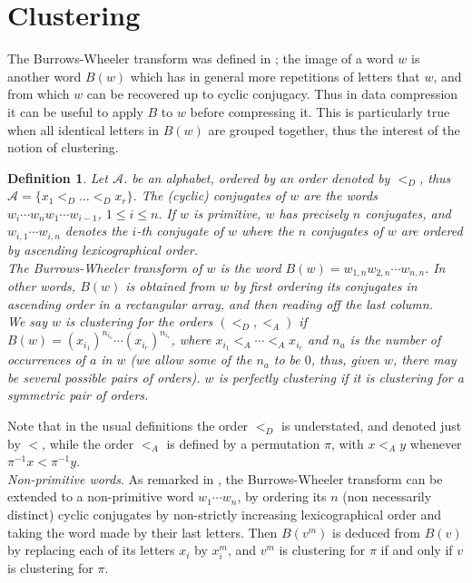 \documentclass[12pt,a4paper]{amsart}
\newtheorem{definition}{Definition}
\begin{document}
  \section{Clustering}
 The Burrows-Wheeler transform was  defined in \cite{bw}; the image of a word $w$ is another word $B(w)$ which has  in general more repetitions of letters that $w$, and from which $w$ can be recovered up to cyclic conjugacy. Thus in data compression it can be useful to apply $B$ to $w$ before compressing it. This is 
 particularly true when all identical letters in  $B(w)$ are grouped together,  thus the interest of the notion of clustering. 
 
\begin{definition}  Let  $\mathcal A$. be an alphabet, ordered by an order denoted by $<_D$, thus $\mathcal A=\{x_1<_D \ldots <_D x_r\}$. The {\em (cyclic) conjugates} of $w$ are  the words $w_i\cdots w_nw_1\cdots w_{i-1}$, $1\leq i\leq n.$ If $w$ is primitive,  $w$ has precisely $n$ conjugates, and $w_{i,1}\cdots w_{i,n}$ 
denotes the $i$-th  conjugate of $w$ where the $n$ conjugates of $w$ are ordered by ascending lexicographical order.\\
 The {\em  Burrows-Wheeler transform} of $w$ is the word $B(w)=w_{1,n}w_{2,n}\cdots w_{n,n}.$
 In other words, $B(w)$ is obtained from $w$ by first ordering its conjugates in ascending order in a rectangular array, and then reading off the last column.\\
 We say $w$ is {\em clustering for the orders} $(<_D,<_A)$  if $B(w)=(x_{i_1})^{n_{i_1}}\cdots (x_{i_r})^{n_{i_r}}$, where $x_{i_1} <_A \cdots <_A x_{i_r}$ and $n_a$ is the number of occurrences of $a$ in $w$ (we allow some of the $n_a$ to be $0$, thus, given  $w$, there may be several 
 possible pairs of orders). $w$ is {\em perfectly} clustering if it is clustering for a symmetric pair of orders.
 \end{definition}
 
Note that in the usual definitions the order $<_D$ is understated, and denoted just by $<$, while the order $<_A$ is defined by a permutation $\pi$, with $x<_A y$ whenever $\pi^{-1} x< \pi^{-1}  y$.\\

{\it Non-primitive words}. As remarked in \cite{mrs}, the Burrows-Wheeler transform can be extended to a non-primitive word $w_1\cdots w_n$, by ordering its $n$ (non necessarily distinct) cyclic conjugates  by non-strictly increasing lexicographical order and taking the word made by their last letters. Then $B(v^m)$ is deduced from $B(v)$ by replacing each of its letters $x_i$ by $x_i^m$, and $v^m$ is clustering for  $\pi$ if and only if $v$ is clustering for  $\pi$.\\
\end{document}
